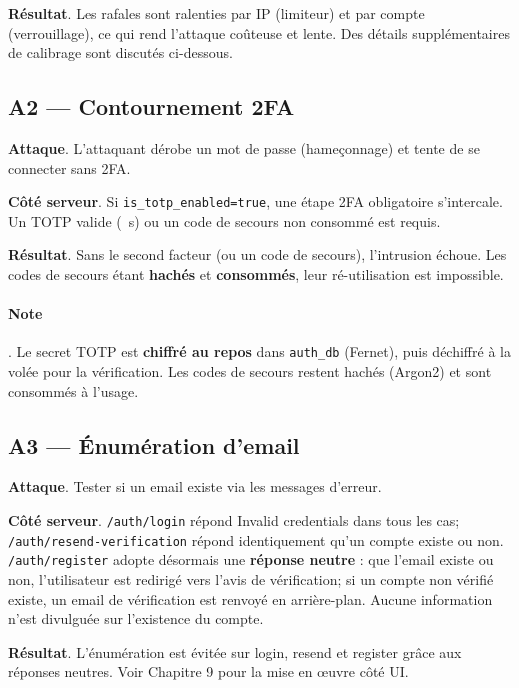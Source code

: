 \textbf{Résultat}. Les rafales sont ralenties par IP (limiteur) et par compte (verrouillage), ce qui rend l'attaque coûteuse et lente. Des détails supplémentaires de calibrage sont discutés ci-dessous.

 

 

\subsection*{A2 — Contournement 2FA}
\textbf{Attaque}. L'attaquant dérobe un mot de passe (hameçonnage) et tente de se connecter sans 2FA.

\textbf{Côté serveur}. Si \texttt{is\_totp\_enabled=true}, une étape 2FA obligatoire s'intercale. Un TOTP valide (~s) ou un code de secours non consommé est requis.

\textbf{Résultat}. Sans le second facteur (ou un code de secours), l'intrusion échoue. Les codes de secours étant \textbf{hachés} et \textbf{consommés}, leur ré-utilisation est impossible.

 

 

\paragraph{Note}. Le secret TOTP est \textbf{chiffré au repos} dans \texttt{auth\_db} (Fernet), puis déchiffré à la volée pour la vérification. Les codes de secours restent hachés (Argon2) et sont consommés à l'usage.

\subsection*{A3 — Énumération d'email}
\textbf{Attaque}. Tester si un email existe via les messages d'erreur.

\textbf{Côté serveur}. \texttt{/auth/login} répond \og Invalid credentials \fg{} dans tous les cas; \texttt{/auth/resend-verification} répond identiquement qu'un compte existe ou non. \texttt{/auth/register} adopte désormais une \textbf{réponse neutre} : que l'email existe ou non, l'utilisateur est redirigé vers l'avis de vérification; si un compte non vérifié existe, un email de vérification est renvoyé en arrière-plan. Aucune information n'est divulguée sur l'existence du compte.

\textbf{Résultat}. L'énumération est évitée sur login, resend et register grâce aux réponses neutres. Voir Chapitre 9 pour la mise en œuvre côté UI.

